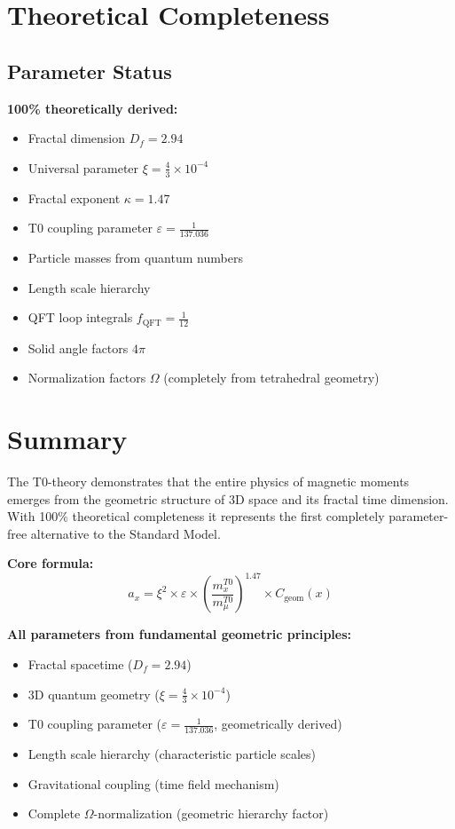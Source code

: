 \documentclass[12pt,a4paper]{article}
\numberwithin{equation}{section}
\newcommand{\xipar}{\xi}
\newcommand{\epsilonT}{\varepsilon}
\newcommand{\Cgeom}{C_{\text{geom}}}
\newcommand{\fQFT}{f_{\text{QFT}}}
\newcommand{\kappaT}{\kappa}
\newcommand{\Df}{D_f}
\newcommand{\Omegafactor}{\Omega}
\begin{document}
	\section{Theoretical Completeness}
	
	\subsection{Parameter Status}
	
	\textbf{100\% theoretically derived:}
	\begin{itemize}
		\item Fractal dimension $\Df = 2.94$
		\item Universal parameter $\xipar = \frac{4}{3} \times 10^{-4}$
		\item Fractal exponent $\kappaT = 1.47$
		\item T0 coupling parameter $\epsilonT = \frac{1}{137.036}$
		\item Particle masses from quantum numbers
		\item Length scale hierarchy
		\item QFT loop integrals $\fQFT = \frac{1}{12}$
		\item Solid angle factors $4\pi$
		\item Normalization factors $\Omegafactor$ (completely from tetrahedral geometry)
	\end{itemize}
	
	
	\section{Summary}
	
	The T0-theory demonstrates that the entire physics of magnetic moments emerges from the geometric structure of 3D space and its fractal time dimension. With 100\% theoretical completeness it represents the first completely parameter-free alternative to the Standard Model.
	
	\textbf{Core formula:}
	\begin{equation}
		a_x = \xipar^2 \times \epsilonT \times \left(\frac{m_x^{T0}}{m_\mu^{T0}}\right)^{1.47} \times \Cgeom(x)
		\label{eq:core_formula}
	\end{equation}
	
	\textbf{All parameters from fundamental geometric principles:}
	\begin{itemize}
		\item Fractal spacetime ($\Df = 2.94$)
		\item 3D quantum geometry ($\xipar = \frac{4}{3} \times 10^{-4}$)
		\item T0 coupling parameter ($\epsilonT = \frac{1}{137.036}$, geometrically derived)
		\item Length scale hierarchy (characteristic particle scales)
		\item Gravitational coupling (time field mechanism)
		\item Complete $\Omegafactor$-normalization (geometric hierarchy factor)
	\end{itemize}
	
\end{document}
